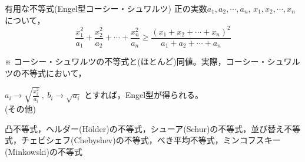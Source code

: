 \documentclass[a4paper,12pt]{jsarticle}
\newcommand{\ds}{\displaystyle}
\begin{document}
\begin{itembox}[l]{有用な不等式(Engel型コーシー・シュワルツ)}
正の実数$a_{1},a_{2},\cdots ,a_{n} , \,x_{1},x_{2},\cdots ,x_{n}$ について，
\begin{equation}
 \frac{x_{1}^{2}}{a_{1}} + \frac{x_{2}^{2}}{a_{2}} + \cdots +\frac{x_{n}^{2}}{a_{n}} \geq \frac{(x_{1}+x_{2}+ \cdots +x_{n})^{2}}{a_{1}+a_{2}+ \cdots +a_{n}} \nonumber
\end{equation}
\end{itembox}

※ コーシー・シュワルツの不等式と(ほとんど)同値。実際，コーシー・シュワルツの不等式において，

$\ds a_{i} \rightarrow \sqrt{\frac{x_{i}^{2}}{{a_{i}}}} \ , \  b_{i} \rightarrow \sqrt{a_{i}}\nonumber
$
とすれば，Engel型が得られる。\\

(その他) 

凸不等式，ヘルダー(H\"older)の不等式，シューア(Schur)の不等式，並び替え不等式，チェビシェフ(Chebyshev)の不等式，べき平均不等式，ミンコフスキー(Minkowski)の不等式
\end{document}
